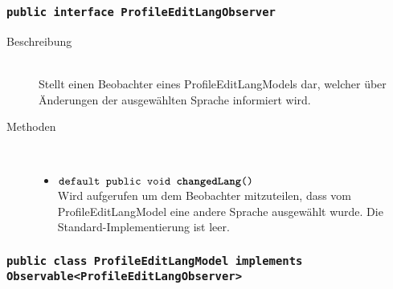 \subsubsection{\normalfont \texttt{public interface \textbf{ProfileEditLangObserver}}}

\begin{description}
\item[Beschreibung] \hfill \\ Stellt einen Beobachter eines ProfileEditLangModels dar, welcher über Änderungen der ausgewählten Sprache informiert wird.

\item[Methoden] \hfill \\
	\vspace{-.8cm}
	\begin{itemize}
		\item $\texttt{default public void \textbf{changedLang}()}$ \\ Wird aufgerufen um dem Beobachter mitzuteilen, 
		dass vom ProfileEditLangModel eine andere Sprache ausgewählt wurde. Die Standard-Implementierung ist leer.
	\end{itemize}
\end{description}

\subsubsection{\normalfont \texttt{public class \textbf{ProfileEditLangModel} implements Observable<ProfileEditLangObserver>}}

